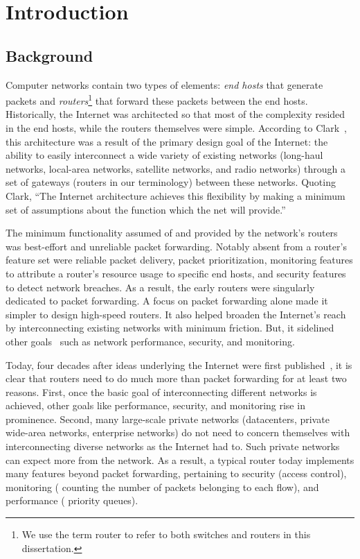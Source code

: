 \chapter{Introduction}
\label{chap:intro}

\section{Background}
\label{s:intro_background}

Computer networks contain two types of elements: {\em end hosts} that generate
packets and {\em routers}\footnote{We use the term router to refer to both
switches and routers in this dissertation.} that forward these packets between
the end hosts. Historically, the Internet was architected so that most of the
complexity resided in the end hosts, while the routers themselves were simple.
According to Clark~\cite{design_philosophy}, this architecture was a result of
the primary design goal of the Internet: the ability to easily interconnect a
wide variety of existing networks (\eg long-haul networks, local-area networks,
satellite networks, and radio networks) through a set of gateways (routers in
our terminology) between these networks. Quoting Clark, ``The Internet
architecture achieves this flexibility by making a minimum set of assumptions
about the function which the net will provide.''

The minimum functionality assumed of and provided by the network's routers was
best-effort and unreliable packet forwarding. Notably absent from a router's
feature set were reliable packet delivery, packet prioritization, monitoring
features to attribute a router's resource usage to specific end hosts, and
security features to detect network breaches. As a result, the early routers
were singularly dedicated to packet forwarding. A focus on packet forwarding
alone made it simpler to design high-speed routers. It also helped broaden the
Internet's reach by interconnecting existing networks with minimum friction.
But, it sidelined other goals~\cite{design_philosophy} such as network
performance, security, and monitoring.
 
Today, four decades after ideas underlying the Internet were first
published~\cite{cerf74}, it is clear that routers need to do much more than
packet forwarding for at least two reasons. First, once the basic goal of
interconnecting different networks is achieved, other goals like performance,
security, and monitoring rise in prominence.  Second, many large-scale private
networks (\eg datacenters, private wide-area networks, enterprise networks) do
not need to concern themselves with interconnecting diverse networks as the
Internet had to. Such private networks can expect more from the network. As a
result, a typical router today implements many features beyond packet
forwarding, pertaining to security (\eg access control), monitoring (\eg
counting the number of packets belonging to each flow), and performance (\eg
priority queues).


